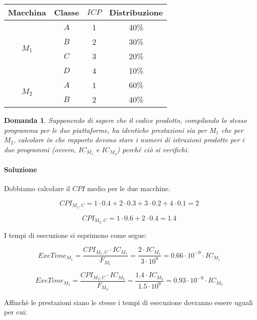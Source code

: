 \documentclass{article}
\newtheorem{domanda}{Domanda}[section]
\begin{document}
\begin{table}[h!]
\begin{tabular}{|c|c|c|c|}
\hline
Macchina               & Classe & $ICP$ & Distribuzione \\ \hline
\multirow{4}{*}{$M_1$} & $A$    & 1     & 40\%          \\ \cline{2-4} 
                       & $B$    & 2     & 30\%          \\ \cline{2-4} 
                       & $C$    & 3     & 20\%          \\ \cline{2-4} 
                       & $D$    & 4     & 10\%          \\ \hline
\multirow{2}{*}{$M_2$} & $A$    & 1     & 60\%          \\ \cline{2-4} 
                       & $B$    & 2     & 40\%          \\ \hline
\end{tabular}
\end{table}

\begin{domanda}
Supponendo di sapere che il codice prodotto, compilando lo stesso programma per le due
piattaforme, ha identiche prestazioni sia per $M_1$ che per $M_2$, calcolare in che rapporto devono stare i numeri di istruzioni prodotte per i due programmi (ovvero, $IC_{M_1}$ e $IC_{M_2}$) perché ciò si verifichi.
\end{domanda}

\paragraph{Soluzione}

Dobbiamo calcolare il $CPI$ medio per le due macchine.

$$CPI_{M_1,C} = 1 \cdot 0.4 + 2 \cdot 0.3 + 3 \cdot 0.2 + 4 \cdot 0.1 = 2$$

$$CPI_{M_2,C} = 1 \cdot 0.6 + 2 \cdot 0.4 = 1.4$$

I tempi di esecuzione si esprimono come segue:

$$ExeTime_{M_1} = \frac{CPI_{M_1,C} \cdot IC_{M_1}}{F_{M_1}} = \frac{2 \cdot IC_{M_1}}{3 \cdot 10^9} = 0.66 \cdot 10^{-9} \cdot IC_{M_1}$$

$$ExeTime_{M_2} = \frac{CPI_{M_2,C} \cdot IC_{M_2}}{F_{M_2}} = \frac{1.4 \cdot IC_{M_2}}{1.5 \cdot 10^9} = 0.93 \cdot 10^{-9} \cdot IC_{M_2}$$

Affinchè le prestazioni siano le stesse i tempi di esecuzione dovranno essere uguali per cui:
\end{document}
